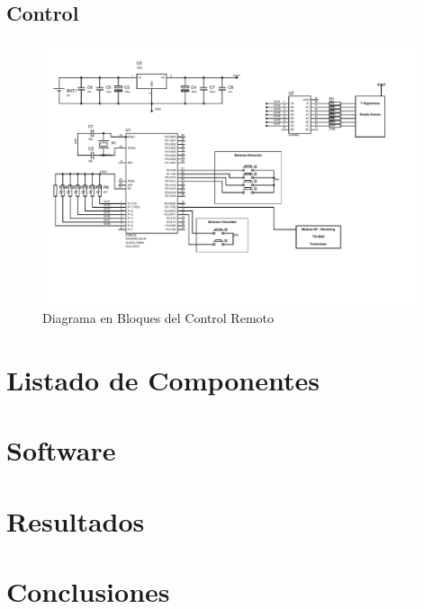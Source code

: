 \documentclass[a4paper,10pt]{article}
\begin{document}
		\subsection{Control}
			\begin{figure}[!htb]
				\centering
				\includegraphics[width=11cm]{Imagenes/EsquematicoControl.PDF}
				\caption{Diagrama en Bloques del Control Remoto} \label{img003}
			\end{figure}
	
	\section{Listado de Componentes}
	\section{Software}
	\section{Resultados}
	\section{Conclusiones}
\end{document}
